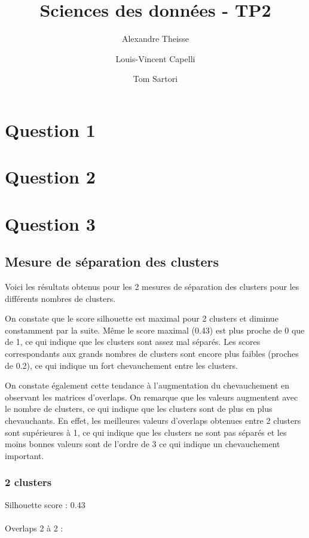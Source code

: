 \documentclass{article}
\title{Sciences des données - TP2}
\author{Alexandre Theisse \and Louis-Vincent Capelli \and Tom Sartori}
\begin{document}
\maketitle
\newpage

\section*{Question 1}

\section*{Question 2}

\section*{Question 3}

\subsection*{Mesure de séparation des clusters}
Voici les résultats obtenus pour les 2 mesures de séparation des clusters
pour les différents nombres de clusters.

On constate que le score silhouette est maximal pour 2 clusters et
diminue constamment par la suite. Même le score maximal (0.43) 
est plus proche de 0 que de 1,
ce qui indique que les clusters sont assez mal séparés. Les scores
correspondants aux grands nombres de clusters sont encore plus faibles
(proches de 0.2), ce qui indique un fort chevauchement entre les clusters.

On constate également cette tendance à l'augmentation du chevauchement
en observant les matrices d'overlaps. On remarque que les valeurs
augmentent avec le nombre de clusters, ce qui indique que les clusters
sont de plus en plus chevauchants. En effet, les meilleures valeurs
d'overlaps obtenues entre 2 clusters sont supérieures à 1, ce qui indique
que les clusters ne sont pas séparés et les moins bonnes valeurs
sont de l'ordre de 3 ce qui indique un chevauchement important.

\subsubsection*{2 clusters}

Silhouette score : 0.43 \\\\
Overlaps 2 à 2 :\\
\end{document}

